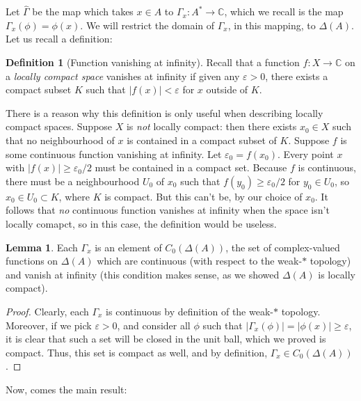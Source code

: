 \documentclass[aps,pra,showpacs,notitlepage,onecolumn,superscriptaddress,nofootinbib]{revtex4-1}
\theoremstyle{definition}
\newtheorem{definition}{Definition}[section]
\newtheorem{lemma}{Lemma}[section]
\begin{document}
\noindent Let $\widehat{\Gamma}$ be the map which takes $x \in A$ to $\Gamma_x : A^{*} \rightarrow \mathbb{C}$, which we recall is the map $\Gamma_x(\phi) = \phi(x)$. We will restrict the domain
of $\Gamma_x$, in this mapping, to $\Delta(A)$. Let us recall a definition:

\begin{definition}[Function vanishing at infinity]
  Recall that a function $f : X \rightarrow \mathbb{C}$ on a \emph{locally compact space}
  vanishes at infinity if given any $\varepsilon > 0$, there exists a compact subset $K$ such that $|f(x)| < \varepsilon$ for $x$ outside of $K$.
  \newline

  \noindent There is a reason why this definition is only useful
  when describing locally compact spaces. Suppose $X$ is \emph{not} locally compact: then there exists $x_0 \in X$ such that no neighbourhood of $x$ is contained in a compact subset of $K$. Suppose
  $f$ is some continuous function vanishing at infinity. Let $\varepsilon_0 = f(x_0)$. Every point $x$ with $|f(x)| \geq \varepsilon_0/2$ must be contained in a compact set. Because $f$ is continuous, there must be a neighbourhood $U_0$
  of $x_0$ such that $f(y_0) \geq \varepsilon_0/2$ for $y_0 \in U_0$, so $x_0 \in U_0 \subset K$, where $K$ is compact. But this can't be, by our choice of $x_0$. It follows that \emph{no} continuous function
  vanishes at infinity when the space isn't locally comapct, so in this case, the definition would be useless.
  \end{definition}

\begin{lemma}
  Each $\Gamma_x$ is an element of $C_0(\Delta(A))$, the set of complex-valued functions on $\Delta(A)$ which are continuous (with respect to the weak-$*$ topology) and vanish at infinity (this
  condition makes sense, as we showed $\Delta(A)$ is locally compact).
\end{lemma}
\begin{proof}
  Clearly, each $\Gamma_x$ is continuous by definition of the weak-$*$ topology. Moreover, if we pick $\varepsilon > 0$, and consider all $\phi$ such that $|\Gamma_x(\phi)| = |\phi(x)| \geq \varepsilon$,
  it is clear that such a set will be closed in the unit ball, which we proved is compact. Thus, this set is compact as well, and by definition, $\Gamma_x \in C_0(\Delta(A))$.
\end{proof}

\noindent Now, comes the main result:
\end{document}

